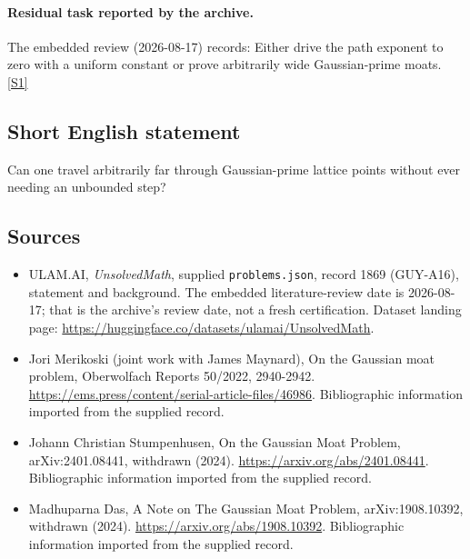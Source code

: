 \documentclass[11pt,a4paper]{article}
\newcommand{\sref}[2]{\hyperlink{source:#1:#2}{[S#2]}}
\begin{document}
\paragraph{Residual task reported by the archive.}

The embedded review (2026-08-17) records: Either drive the path exponent to zero with a uniform constant or prove arbitrarily wide Gaussian-prime moats. \sref{1869}{1}

\subsection{Short English statement}

Can one travel arbitrarily far through Gaussian-prime lattice points without ever needing an unbounded step?

\subsection{Sources}

{\small

\begin{itemize}

\item[\hypertarget{source:1869:1}{S1}] ULAM.AI, \emph{UnsolvedMath}, supplied \texttt{problems.json}, record 1869 (GUY-A16), statement and background. The embedded literature-review date is 2026-08-17; that is the archive’s review date, not a fresh certification. Dataset landing page: \url{https://huggingface.co/datasets/ulamai/UnsolvedMath}.

\item[\hypertarget{source:1869:2}{S2}] Jori Merikoski (joint work with James Maynard), On the Gaussian moat problem, Oberwolfach Reports 50/2022, 2940-2942. \url{https://ems.press/content/serial-article-files/46986}. Bibliographic information imported from the supplied record.

\item[\hypertarget{source:1869:3}{S3}] Johann Christian Stumpenhusen, On the Gaussian Moat Problem, arXiv:2401.08441, withdrawn (2024). \url{https://arxiv.org/abs/2401.08441}. Bibliographic information imported from the supplied record.

\item[\hypertarget{source:1869:4}{S4}] Madhuparna Das, A Note on The Gaussian Moat Problem, arXiv:1908.10392, withdrawn (2024). \url{https://arxiv.org/abs/1908.10392}. Bibliographic information imported from the supplied record.

\end{itemize}

}

\label{end:1869}
\end{document}
